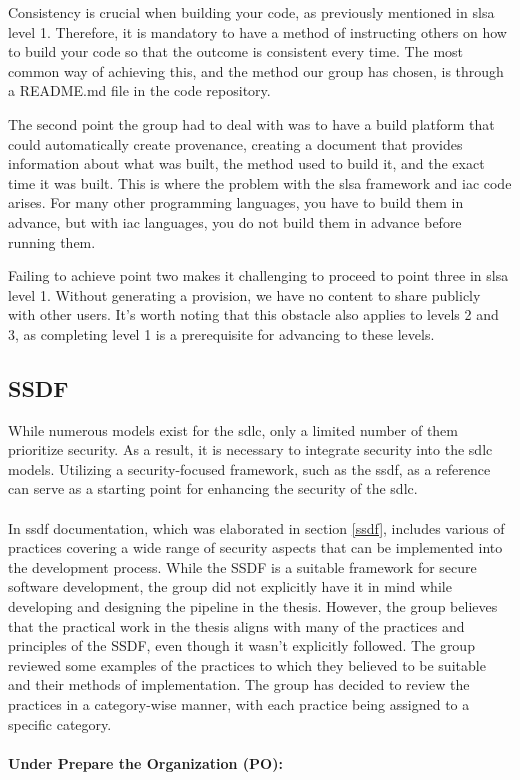 Consistency is crucial when building your code, as previously mentioned in \acrshort{slsa} level 1. Therefore, it is mandatory to have a method of instructing others on how to build your code so that the outcome is consistent every time. The most common way of achieving this, and the method our group has chosen, is through a README.md file in the code repository. 

The second point the group had to deal with was to have a build platform that could automatically create \gls{provenance}, creating a document that provides information about what was built, the method used to build it, and the exact time it was built. This is where the problem with the \acrshort{slsa} framework and \acrshort{iac} code arises. For many other programming languages, you have to build them in advance, but with \acrshort{iac} languages, you do not build them in advance before running them.

Failing to achieve point two makes it challenging to proceed to point three in \acrshort{slsa} level 1. Without generating a provision, we have no content to share publicly with other users. It's worth noting that this obstacle also applies to levels 2 and 3, as completing level 1 is a prerequisite for advancing to these levels.

\subsection{SSDF}
While numerous models exist for the \acrlong{sdlc}, only a limited number of them prioritize security. As a result, it is necessary to integrate security into the \acrshort{sdlc} models. Utilizing a security-focused framework, such as the \acrshort{ssdf}, as a reference can serve as a starting point for enhancing the security of the \acrshort{sdlc}. 
\\~\\
In \acrshort{ssdf} documentation, which was elaborated in section \ref{ssdf}, includes various of  practices covering a wide range of security aspects that can be implemented into the development process. While the SSDF is a suitable framework for secure software development, the group did not explicitly have it in mind while developing and designing the pipeline in the thesis. However, the group believes that the practical work in the thesis aligns with many of the practices and principles of the SSDF, even though it wasn't explicitly followed. The group reviewed some examples of the practices to which they believed to be suitable and their methods of implementation. The group has decided to review the practices in a category-wise manner, with each practice being assigned to a specific category. 
\\~\\
\textbf{Under Prepare the Organization (PO):}

